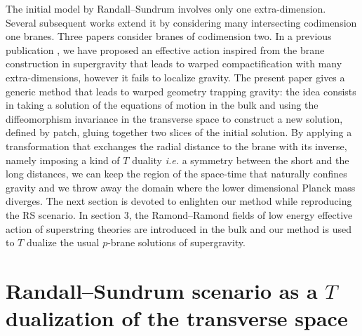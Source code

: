\documentclass[a4paper,12pt]{article}
\begin{document}
The initial model by Randall--Sundrum involves only one extra-dimension. Several
subsequent works \cite{intersections} extend it by considering many intersecting
codimension one branes. Three papers \cite{TwoExtra} consider branes of codimension two.
In a previous publication \cite{CGS3}, we have proposed an effective action inspired
from the brane construction in supergravity that leads to warped compactification
with many extra-dimensions, however it fails to localize gravity. The present paper
gives a generic method that leads to warped geometry trapping gravity: the idea
consists in taking a solution of the equations of motion in the bulk and using
the diffeomorphism invariance in the transverse space to construct a new solution,
defined by patch, gluing together two slices of the initial solution. By
applying a transformation that exchanges the radial distance to the brane with its
inverse, namely imposing a kind of $T$ duality {\it i.e.} a symmetry between
the short and the long distances, we can keep the region of the space-time
that naturally confines gravity and we throw away the domain where the lower
dimensional Planck mass diverges. The next section is devoted to enlighten
our method while reproducing the RS scenario. In section 3, the Ramond--Ramond
fields of low energy effective action of superstring theories are introduced in the
bulk and our method is used to $T$ dualize the usual $p$-brane solutions of
supergravity.

\section{Randall--Sundrum scenario as a $T$ dualization of the transverse space}
\end{document}
